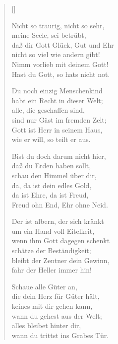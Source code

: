 \begin{multicols}{2}
\settowidth{\versewidth}{Nicht so traurig, nicht so sehr,}
\begin{verse}[\versewidth]

 Nicht so traurig, nicht so sehr,\\
meine Seele, sei betrübt,\\
daß dir Gott Glück, Gut und Ehr\\
nicht so viel wie andern gibt!\\
Nimm vorlieb mit deinem Gott!\\
Hast du Gott, so hats nicht not.

 Du noch einzig Menschenkind\\
habt ein Recht in dieser Welt;\\
alle, die geschaffen sind,\\
sind nur Gäst im fremden Zelt;\\
Gott ist Herr in seinem Haus,\\
wie er will, so teilt er aus.

 Bist du doch darum nicht hier,\\
daß du Erden haben sollt,\\
schau den Himmel über dir,\\
da, da ist dein edles Gold,\\
da ist Ehre, da ist Freud,\\
Freud ohn End, Ehr ohne Neid.

 Der ist albern, der sich kränkt\\
um ein Hand voll Eitelkeit,\\
wenn ihm Gott dagegen schenkt\\
schätze der Beständigkeit;\\
bleibt der Zentner dein Gewinn,\\
fahr der Heller immer hin!

 Schaue alle Güter an,\\
die dein Herz für Güter hält,\\
keines mit dir gehen kann,\\
wann du gehest aus der Welt;\\
alles bleibet hinter dir,\\
wann du trittst ins Grabes Tür.


\end{verse}
\end{multicols}
